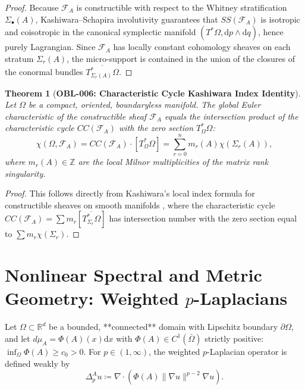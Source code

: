 \documentclass[11pt,a4paper,reqno]{amsart}
\newtheorem{theorem}{Theorem}[section]
\theoremstyle{definition}
\theoremstyle{remark}
\numberwithin{equation}{section}
\newcommand{\dif}{\mathrm{d}}
\begin{document}
\begin{proof}
Because $\mathcal{F}_A$ is constructible with respect to the Whitney stratification $\Sigma_\bullet(A)$, Kashiwara--Schapira involutivity \cite{KashiwaraSchapira1990} guarantees that $SS(\mathcal{F}_A)$ is isotropic and coisotropic in the canonical symplectic manifold $(T^*\Omega, \dif p \wedge \dif q)$, hence purely Lagrangian. Since $\mathcal{F}_A$ has locally constant cohomology sheaves on each stratum $\Sigma_r(A)$, the micro-support is contained in the union of the closures of the conormal bundles $\overline{T^*_{\Sigma_r(A)} \Omega}$.
\end{proof}

\begin{theorem}[\textbf{OBL-006: Characteristic Cycle Kashiwara Index Identity}]
\label{thm:kashiwara_index_cc}
Let $\Omega$ be a compact, oriented, boundaryless manifold. The global Euler characteristic of the constructible sheaf $\mathcal{F}_A$ equals the intersection product of the characteristic cycle $CC(\mathcal{F}_A)$ with the zero section $T^*_\Omega \Omega$:
\begin{equation}
\chi(\Omega, \mathcal{F}_A) = CC(\mathcal{F}_A) \cdot [T^*_\Omega \Omega] = \sum_{r=0}^n m_r(A) \chi(\Sigma_r(A)),
\end{equation}
where $m_r(A) \in \mathbb{Z}$ are the local Milnor multiplicities of the matrix rank singularity.
\end{theorem}

\begin{proof}
This follows directly from Kashiwara's local index formula for constructible sheaves on smooth manifolds \cite{KashiwaraSchapira1990}, where the characteristic cycle $CC(\mathcal{F}_A) = \sum m_r [\overline{T^*_{\Sigma_r} \Omega}]$ has intersection number with the zero section equal to $\sum m_r \chi(\Sigma_r)$.
\end{proof}

\section{Nonlinear Spectral and Metric Geometry: Weighted \texorpdfstring{$p$}{p}-Laplacians}
\label{sec:nonlinear}

Let $\Omega \subset \mathbb{R}^d$ be a bounded, **connected** domain with Lipschitz boundary $\partial\Omega$, and let $d\mu_A = \Phi(A)(x) \dif x$ with $\Phi(A) \in C^1(\bar{\Omega})$ strictly positive: $\inf_\Omega \Phi(A) \ge c_0 > 0$. For $p \in (1, \infty)$, the weighted $p$-Laplacian operator is defined weakly by
\begin{equation}
\Delta_p^A u \coloneqq \nabla \cdot \left( \Phi(A) \|\nabla u\|^{p-2} \nabla u \right).
\end{equation}
\end{document}
